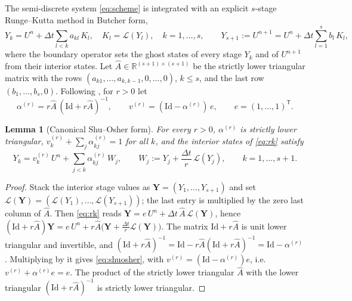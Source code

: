 \documentclass[11pt,a4paper]{article}
\theoremstyle{plain}
\newtheorem{lemma}[theorem]{Lemma}
\theoremstyle{definition}
\theoremstyle{remark}
\numberwithin{equation}{section}
\newcommand{\R}{\mathbb{R}}
\newcommand{\Lop}{\mathcal{L}}
\begin{document}
The semi-discrete system \eqref{eq:scheme} is integrated with an explicit $s$-stage Runge--Kutta method in Butcher form,
\begin{equation}\label{eq:rk}
Y_k = U^n+\Delta t\sum_{l<k}a_{kl}\,K_l,\quad K_l=\Lop(Y_l),\quad k=1,\dots,s,\qquad Y_{s+1}:=U^{n+1}=U^n+\Delta t\sum_{l=1}^sb_l\,K_l,
\end{equation}
where the boundary operator sets the ghost states of every stage $Y_k$ and of $U^{n+1}$ from their interior states. Let $\hat A\in\R^{(s+1)\times(s+1)}$ be the strictly lower triangular matrix with the rows $(a_{k1},\dots,a_{k,k-1},0,\dots,0)$, $k\le s$, and the last row $(b_1,\dots,b_s,0)$. Following \cite{Ketcheson2008,GottliebKetchesonShu2011}, for $r>0$ let
\begin{equation}\label{eq:canonical}
\alpha^{(r)}=r\hat A\,(\mathrm{Id}+r\hat A)^{-1},\qquad v^{(r)}=(\mathrm{Id}-\alpha^{(r)})\,e,\qquad e=(1,\dots,1)^{\mathsf T}.
\end{equation}

\begin{lemma}[Canonical Shu--Osher form]\label{lem:canonical}
For every $r>0$, $\alpha^{(r)}$ is strictly lower triangular, $v^{(r)}_k+\sum_j\alpha^{(r)}_{kj}=1$ for all $k$, and the interior states of \eqref{eq:rk} satisfy
\begin{equation}\label{eq:shuosher}
Y_k=v^{(r)}_k\,U^n+\sum_{j<k}\alpha^{(r)}_{kj}\,W_j,\qquad W_j:=Y_j+\frac{\Delta t}{r}\,\Lop(Y_j),\qquad k=1,\dots,s+1 .
\end{equation}
\end{lemma}

\begin{proof}
Stack the interior stage values as $\mathbf Y=(Y_1,\dots,Y_{s+1})$ and set $\Lop(\mathbf Y)=(\Lop(Y_1),\dots,\Lop(Y_{s+1}))$; the last entry is multiplied by the zero last column of $\hat A$. Then \eqref{eq:rk} reads $\mathbf Y=e\,U^n+\Delta t\,\hat A\,\Lop(\mathbf Y)$, hence $(\mathrm{Id}+r\hat A)\mathbf Y=e\,U^n+r\hat A\big(\mathbf Y+\tfrac{\Delta t}{r}\Lop(\mathbf Y)\big)$. The matrix $\mathrm{Id}+r\hat A$ is unit lower triangular and invertible, and $(\mathrm{Id}+r\hat A)^{-1}=\mathrm{Id}-r\hat A(\mathrm{Id}+r\hat A)^{-1}=\mathrm{Id}-\alpha^{(r)}$. Multiplying by it gives \eqref{eq:shuosher}, with $v^{(r)}=(\mathrm{Id}-\alpha^{(r)})e$, i.e.\ $v^{(r)}+\alpha^{(r)}e=e$. The product of the strictly lower triangular $\hat A$ with the lower triangular $(\mathrm{Id}+r\hat A)^{-1}$ is strictly lower triangular.
\end{proof}
\end{document}
